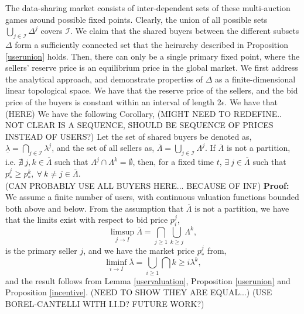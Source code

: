 \documentclass[sigconf, anonymous]{acmart}
\newcommand{\mcI}{\mathcal{I}}
\theoremstyle{definition}
\begin{document}
{
}

The data-sharing market consists of inter-dependent sets of these
multi-auction games around possible fixed points.  Clearly, the union of all possible
sets $\bigcup_{j\in\mcI} \Delta^j$ covers $\mcI$. We claim that the shared buyers
between the different subsets $\Delta$ form a sufficiently connected set that
the heirarchy described in Proposition \ref{userunion} holds. Then,
there can only be a single primary fixed point, where the sellers' reserve
price is an equilibrium price in the global market. 
We first address the analytical approach, and demonstrate properties of
$\Delta$ as a finite-dimensional linear topological space. We have that the
reserve price of the sellers, and the bid price of the buyers is constant
within an interval of length 2$\epsilon$. We have that 
(HERE) We have the following
Corollary, (MIGHT NEED TO REDEFINE.. NOT CLEAR IS A SEQUENCE, SHOULD BE
SEQUENCE OF PRICES INSTEAD OF USERS?) 
{
Let the set of shared buyers be denoted as,
$\underline{\lambda} = \bigcap_{j\in\mcI} \lambda^j$, and the set of all
sellers as, $\overline{\Lambda} = \bigcup_{j\in\mcI}\Lambda^j$. If
$\overline{\Lambda}$ is not a partition, i.e. $\nexists \ j,k
\in\overline{\Lambda}$ such that $\Lambda^j \cap \Lambda^k = \emptyset$, then,
for a fixed time $t$,
$\exists \ j \in\overline{\Lambda}$ such that $p_*^j \ge p_*^k, \ \forall \
k\ne j\in\overline{\Lambda}$. 
}\\
(CAN PROBABLY USE ALL BUYERS HERE... BECAUSE OF INF)
\textbf{Proof:}
We assume a finite number of users, with continuous valuation functions bounded both
above and below. From the assumption that $\overline{\Lambda}$ is not a
partition, we have that the limits exist with respect to bid price $p_i^j$, 
$$
    \limsup\limits_{j\to I} \overline{\Lambda} =  \bigcap_{j\ge 1}\bigcup_{k\ge j} \Lambda^k,
$$
is the primary seller $j$, and we have the market price $p_*^j$ from,
$$
    \liminf\limits_{i\to I} \overline{\lambda} = \bigcup_{i\ge 1}\bigcap{k\ge i}
\lambda^k,
$$
and the result follows from Lemma \ref{uservaluation}, Proposition
\ref{userunion} and Proposition \ref{incentive}.
(NEED TO SHOW THEY ARE EQUAL...)
(USE BOREL-CANTELLI WITH I.I.D? FUTURE WORK?)
\end{document}

